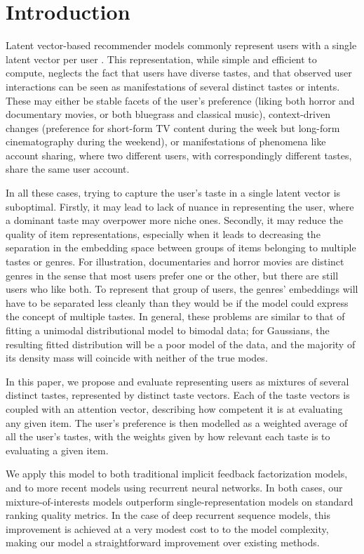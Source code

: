 \documentclass[sigconf]{acmart}
\begin{document}
\section{Introduction}
Latent vector-based recommender models commonly represent users with a single latent vector per user \citep{koren2009bellkor, hu2008collaborative}. This representation, while simple and efficient to compute, neglects the fact that users have diverse tastes, and that observed user interactions can be seen as manifestations of several distinct tastes or intents. These may either be stable facets of the user's preference (liking both horror and documentary movies, or both bluegrass and classical music), context-driven changes (preference for short-form TV content during the week but long-form cinematography during the weekend), or manifestations of phenomena like account sharing, where two different users, with correspondingly different tastes, share the same user account.

In all these cases, trying to capture the user's taste in a single latent vector is suboptimal. Firstly, it may lead to lack of nuance in representing the user, where a dominant taste may overpower more niche ones. Secondly, it may reduce the quality of item representations, especially when it leads to decreasing the separation in the embedding space between groups of items belonging to multiple tastes or genres. For illustration, documentaries and horror movies are distinct genres in the sense that most users prefer one or the other, but there are still users who like both. To represent that group of users, the genres' embeddings will have to be separated less cleanly than they would be if the model could express the concept of multiple tastes. In general, these problems are similar to that of fitting a unimodal distributional model to bimodal data; for Gaussians, the resulting fitted distribution will be a poor model of the data, and the majority of its density mass will coincide with neither of the true modes.

In this paper, we propose and evaluate representing users as mixtures of several distinct tastes, represented by distinct taste vectors. Each of the taste vectors is coupled with an attention vector, describing how competent it is at evaluating any given item. The user's preference is then modelled as a weighted average of all the user's tastes, with the weights given by how relevant each taste is to evaluating a given item.

We apply this model to both traditional implicit feedback factorization models, and to more recent models using recurrent neural networks. In both cases, our mixture-of-interests models outperform single-representation models on standard ranking quality metrics. In the case of deep recurrent sequence models, this improvement is achieved at a very modest cost to to the model complexity, making our model a straightforward improvement over existing methods.
\end{document}
